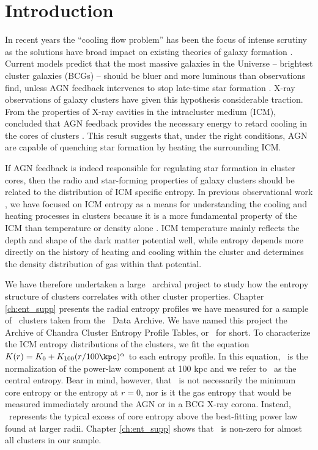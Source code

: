 \section{Introduction}
\label{sec:haradintro}

In recent years the ``cooling flow problem'' has been the focus of
intense scrutiny as the solutions have broad impact on existing
theories of galaxy formation \citep[see][for a
  review]{cfreview}. Current models predict that the most massive
galaxies in the Universe -- brightest cluster galaxies (BCGs) --
should be bluer and more luminous than observations find, unless AGN
feedback intervenes to stop late-time star formation \citep{bower06,
  croton06, saro06}. X-ray observations of galaxy clusters have given
this hypothesis considerable traction. From the properties of X-ray
cavities in the intracluster medium (ICM), \cite{birzan04} concluded
that AGN feedback provides the necessary energy to retard cooling in
the cores of clusters \citep[see][for a review]{mcnamrev}. This result
suggests that, under the right conditions, AGN are capable of
quenching star formation by heating the surrounding ICM.

If AGN feedback is indeed responsible for regulating star formation in
cluster cores, then the radio and star-forming properties of galaxy
clusters should be related to the distribution of ICM specific
entropy. In previous observational work \citep[see][and Chapter
  \ref{ch:ent_supp}]{radioquiet, d06}, we have focused on ICM entropy
as a means for understanding the cooling and heating processes in
clusters because it is a more fundamental property of the ICM than
temperature or density alone \citep{voitbryan,voitreview}. ICM
temperature mainly reflects the depth and shape of the dark matter
potential well, while entropy depends more directly on the history of
heating and cooling within the cluster and determines the density
distribution of gas within that potential.

We have therefore undertaken a large \chandra\ archival project to
study how the entropy structure of clusters correlates with other
cluster properties. Chapter \ref{ch:ent_supp} presents the radial
entropy profiles we have measured for a sample of
\entsuppnum\ clusters taken from the \chandra\ Data Archive. We have
named this project the Archive of Chandra Cluster Entropy Profile
Tables, or \accept\ for short. To characterize the ICM entropy
distributions of the clusters, we fit the equation $K(r) = K_0
+K_{100}(r/100 \kpc)^{\alpha}$ to each entropy profile. In this
equation, \khun\ is the normalization of the power-law component at
100 kpc and we refer to \kna\ as the central entropy. Bear in mind,
however, that \kna\ is not necessarily the minimum core entropy or the
entropy at $r=0$, nor is it the gas entropy that would be measured
immediately around the AGN or in a BCG X-ray corona. Instead,
\kna\ represents the typical excess of core entropy above the
best-fitting power law found at larger radii. Chapter \ref{ch:ent_supp}
shows that \kna\ is non-zero for almost all clusters in our sample.

